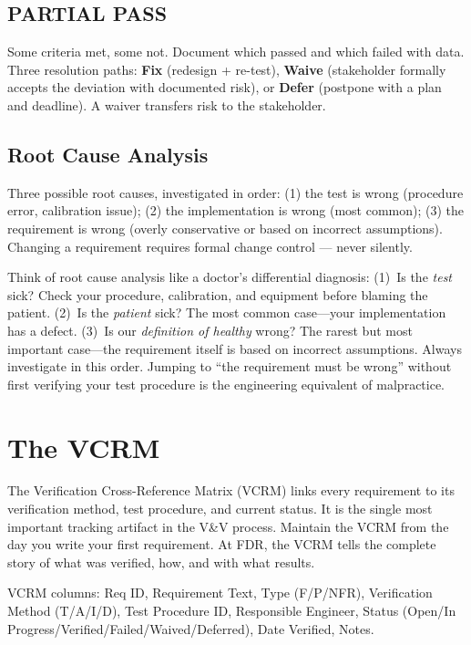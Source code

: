 \documentclass[11pt,letterpaper,twoside,openany]{book}
\begin{document}
\subsection{PARTIAL PASS}
Some criteria met, some not. Document which passed and which failed with data. Three resolution paths: \textbf{Fix} (redesign + re-test), \textbf{Waive} (stakeholder formally accepts the deviation with documented risk), or \textbf{Defer} (postpone with a plan and deadline). A waiver transfers risk to the stakeholder.

\subsection{Root Cause Analysis}
Three possible root causes, investigated in order: (1) the test is wrong (procedure error, calibration issue); (2) the implementation is wrong (most common); (3) the requirement is wrong (overly conservative or based on incorrect assumptions). Changing a requirement requires formal change control --- never silently.

\begin{tipbox}
Think of root cause analysis like a doctor's differential diagnosis: (1)~Is the \emph{test} sick? Check your procedure, calibration, and equipment before blaming the patient. (2)~Is the \emph{patient} sick? The most common case---your implementation has a defect. (3)~Is our \emph{definition of healthy} wrong? The rarest but most important case---the requirement itself is based on incorrect assumptions. Always investigate in this order. Jumping to ``the requirement must be wrong'' without first verifying your test procedure is the engineering equivalent of malpractice.
\end{tipbox}

\FloatBarrier
\section{The VCRM}
The Verification Cross-Reference Matrix (VCRM) links every requirement to its verification method, test procedure, and current status. It is the single most important tracking artifact in the V\&V process. Maintain the VCRM from the day you write your first requirement. At FDR, the VCRM tells the complete story of what was verified, how, and with what results.

VCRM columns: Req ID, Requirement Text, Type (F/P/NFR), Verification Method (T/A/I/D), Test Procedure ID, Responsible Engineer, Status (Open/In Progress/Verified/Failed/Waived/Deferred), Date Verified, Notes.
\end{document}

